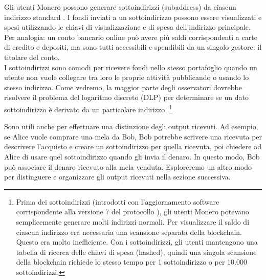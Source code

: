 Gli utenti Monero possono generare sottoindirizzi (subaddress) da ciascun indirizzo standard \cite{MRL-0006-subaddresses}. I fondi inviati a un sottoindirizzo possono essere visualizzati e spesi utilizzando le chiavi di visualizzazione e di spesa dell’indirizzo principale. Per analogia: un conto bancario online può avere più saldi corrispondenti a carte di credito e depositi, ma sono tutti accessibili e spendibili da un singolo gestore: il titolare del conto.\\

I sottoindirizzi sono comodi per ricevere fondi nello stesso portafoglio quando un utente non vuole collegare tra loro le proprie attività pubblicando o usando lo stesso indirizzo. Come vedremo, la maggior parte degli osservatori dovrebbe risolvere il problema del logaritmo discreto (DLP) per determinare se un dato sottoindirizzo è derivato da un particolare indirizzo \cite{MRL-0006-subaddresses}.\footnote{Prima dei sottoindirizzi (introdotti con l’aggiornamento software corrispondente alla versione 7 del protocollo \cite{subaddress-pull-request}), gli utenti Monero potevano semplicemente generare molti indirizzi normali. Per visualizzare il saldo di ciascun indirizzo era necessaria una scansione separata della blockchain. Questo era molto inefficiente. Con i sottoindirizzi, gli utenti mantengono una tabella di ricerca delle chiavi di spesa (hashed), quindi una singola scansione della blockchain richiede lo stesso tempo per 1 sottoindirizzo o per 10.000 sottoindirizzi.}

Sono utili anche per effettuare una distinzione degli output ricevuti. Ad esempio, se Alice vuole comprare una mela da Bob, Bob potrebbe scrivere una ricevuta per descrivere l’acquisto e creare un sottoindirizzo per quella ricevuta, poi chiedere ad Alice di usare quel sottoindirizzo quando gli invia il denaro. In questo modo, Bob può associare il denaro ricevuto alla mela venduta. Esploreremo un altro modo per distinguere e organizzare gli output ricevuti nella sezione successiva.%

